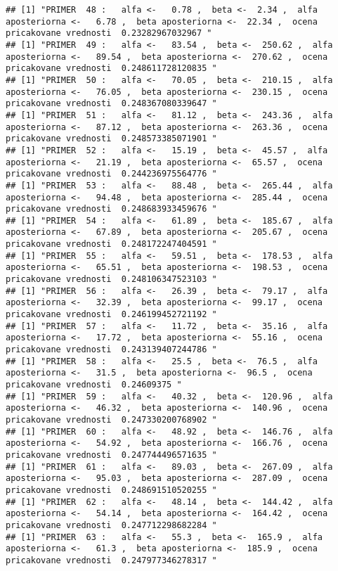 \documentclass[
]{article}
\begin{document}
\begin{verbatim}
## [1] "PRIMER  48 :   alfa <-   0.78 ,  beta <-  2.34 ,  alfa aposteriorna <-   6.78 ,  beta aposteriorna <-  22.34 ,  ocena pricakovane vrednosti  0.23282967032967 "
## [1] "PRIMER  49 :   alfa <-   83.54 ,  beta <-  250.62 ,  alfa aposteriorna <-   89.54 ,  beta aposteriorna <-  270.62 ,  ocena pricakovane vrednosti  0.248611728120835 "
## [1] "PRIMER  50 :   alfa <-   70.05 ,  beta <-  210.15 ,  alfa aposteriorna <-   76.05 ,  beta aposteriorna <-  230.15 ,  ocena pricakovane vrednosti  0.248367080339647 "
## [1] "PRIMER  51 :   alfa <-   81.12 ,  beta <-  243.36 ,  alfa aposteriorna <-   87.12 ,  beta aposteriorna <-  263.36 ,  ocena pricakovane vrednosti  0.248573385071901 "
## [1] "PRIMER  52 :   alfa <-   15.19 ,  beta <-  45.57 ,  alfa aposteriorna <-   21.19 ,  beta aposteriorna <-  65.57 ,  ocena pricakovane vrednosti  0.244236975564776 "
## [1] "PRIMER  53 :   alfa <-   88.48 ,  beta <-  265.44 ,  alfa aposteriorna <-   94.48 ,  beta aposteriorna <-  285.44 ,  ocena pricakovane vrednosti  0.248683933459676 "
## [1] "PRIMER  54 :   alfa <-   61.89 ,  beta <-  185.67 ,  alfa aposteriorna <-   67.89 ,  beta aposteriorna <-  205.67 ,  ocena pricakovane vrednosti  0.248172247404591 "
## [1] "PRIMER  55 :   alfa <-   59.51 ,  beta <-  178.53 ,  alfa aposteriorna <-   65.51 ,  beta aposteriorna <-  198.53 ,  ocena pricakovane vrednosti  0.248106347523103 "
## [1] "PRIMER  56 :   alfa <-   26.39 ,  beta <-  79.17 ,  alfa aposteriorna <-   32.39 ,  beta aposteriorna <-  99.17 ,  ocena pricakovane vrednosti  0.246199452721192 "
## [1] "PRIMER  57 :   alfa <-   11.72 ,  beta <-  35.16 ,  alfa aposteriorna <-   17.72 ,  beta aposteriorna <-  55.16 ,  ocena pricakovane vrednosti  0.243139407244786 "
## [1] "PRIMER  58 :   alfa <-   25.5 ,  beta <-  76.5 ,  alfa aposteriorna <-   31.5 ,  beta aposteriorna <-  96.5 ,  ocena pricakovane vrednosti  0.24609375 "
## [1] "PRIMER  59 :   alfa <-   40.32 ,  beta <-  120.96 ,  alfa aposteriorna <-   46.32 ,  beta aposteriorna <-  140.96 ,  ocena pricakovane vrednosti  0.247330200768902 "
## [1] "PRIMER  60 :   alfa <-   48.92 ,  beta <-  146.76 ,  alfa aposteriorna <-   54.92 ,  beta aposteriorna <-  166.76 ,  ocena pricakovane vrednosti  0.247744496571635 "
## [1] "PRIMER  61 :   alfa <-   89.03 ,  beta <-  267.09 ,  alfa aposteriorna <-   95.03 ,  beta aposteriorna <-  287.09 ,  ocena pricakovane vrednosti  0.248691510520255 "
## [1] "PRIMER  62 :   alfa <-   48.14 ,  beta <-  144.42 ,  alfa aposteriorna <-   54.14 ,  beta aposteriorna <-  164.42 ,  ocena pricakovane vrednosti  0.247712298682284 "
## [1] "PRIMER  63 :   alfa <-   55.3 ,  beta <-  165.9 ,  alfa aposteriorna <-   61.3 ,  beta aposteriorna <-  185.9 ,  ocena pricakovane vrednosti  0.247977346278317 "

\end{verbatim}
\end{document}
